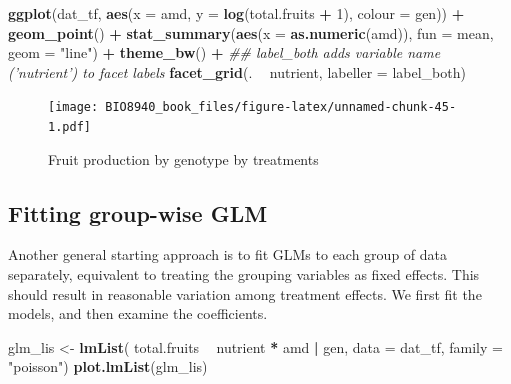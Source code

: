 \documentclass[
  12pt,
]{book}
\newenvironment{Shaded}{\begin{snugshade}}{\end{snugshade}}
\newcommand{\CommentTok}[1]{\textcolor[rgb]{0.56,0.35,0.01}{\textit{#1}}}
\newcommand{\DataTypeTok}[1]{\textcolor[rgb]{0.13,0.29,0.53}{#1}}
\newcommand{\DecValTok}[1]{\textcolor[rgb]{0.00,0.00,0.81}{#1}}
\newcommand{\KeywordTok}[1]{\textcolor[rgb]{0.13,0.29,0.53}{\textbf{#1}}}
\newcommand{\NormalTok}[1]{#1}
\newcommand{\OperatorTok}[1]{\textcolor[rgb]{0.81,0.36,0.00}{\textbf{#1}}}
\newcommand{\StringTok}[1]{\textcolor[rgb]{0.31,0.60,0.02}{#1}}
\begin{document}
\begin{Shaded}
\begin{Highlighting}[]
\KeywordTok{ggplot}\NormalTok{(dat_tf, }\KeywordTok{aes}\NormalTok{(}\DataTypeTok{x =}\NormalTok{ amd, }\DataTypeTok{y =} \KeywordTok{log}\NormalTok{(total.fruits }\OperatorTok{+}\StringTok{ }\DecValTok{1}\NormalTok{), }\DataTypeTok{colour =}\NormalTok{ gen)) }\OperatorTok{+}
\StringTok{  }\KeywordTok{geom_point}\NormalTok{() }\OperatorTok{+}
\StringTok{  }\KeywordTok{stat_summary}\NormalTok{(}\KeywordTok{aes}\NormalTok{(}\DataTypeTok{x =} \KeywordTok{as.numeric}\NormalTok{(amd)), }\DataTypeTok{fun =}\NormalTok{ mean, }\DataTypeTok{geom =} \StringTok{"line"}\NormalTok{) }\OperatorTok{+}
\StringTok{  }\KeywordTok{theme_bw}\NormalTok{() }\OperatorTok{+}
\StringTok{  }\CommentTok{## label_both adds variable name ('nutrient') to facet labels}
\StringTok{  }\KeywordTok{facet_grid}\NormalTok{(. }\OperatorTok{~}\StringTok{ }\NormalTok{nutrient, }\DataTypeTok{labeller =}\NormalTok{ label_both)}
\end{Highlighting}
\end{Shaded}

\begin{figure}
\centering
\texttt{[image: BIO8940\_book\_files/figure-latex/unnamed-chunk-45-1.pdf]}
\caption{\label{fig:unnamed-chunk-45}Fruit production by genotype by treatments}
\end{figure}

\hypertarget{fitting-group-wise-glm}{%
\subsection{Fitting group-wise GLM}\label{fitting-group-wise-glm}}

Another general starting approach is to fit GLMs to each group of data separately, equivalent to treating the grouping variables as fixed effects.
This should result in reasonable variation among treatment effects. We first fit the models, and then examine the coefficients.

\begin{Shaded}
\begin{Highlighting}[]
\NormalTok{glm_lis <-}\StringTok{ }\KeywordTok{lmList}\NormalTok{(}
\NormalTok{  total.fruits }\OperatorTok{~}\StringTok{ }\NormalTok{nutrient }\OperatorTok{*}\StringTok{ }\NormalTok{amd }\OperatorTok{|}\StringTok{ }\NormalTok{gen,}
  \DataTypeTok{data =}\NormalTok{ dat_tf,}
  \DataTypeTok{family =} \StringTok{"poisson"}\NormalTok{)}
\KeywordTok{plot.lmList}\NormalTok{(glm_lis)}
\end{Highlighting}
\end{Shaded}
\end{document}
